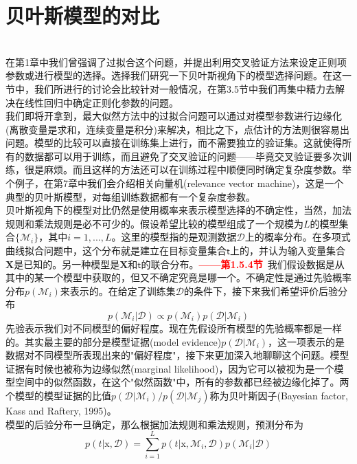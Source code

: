 \documentclass[b5paper]{book}
\numberwithin{equation}{chapter}
\newcommand {\bx} {\boldsymbol{\mathrm{x}}}
\newcommand {\sft} {\boldsymbol{\mathsf{t}}}
\newcommand {\calD} {\mathcal{D}}
\newcommand {\insertline} {\noindent{\color{red} \rule[5pt]{\textwidth}{0.1em}}}
\begin{document}
	\section{贝叶斯模型的对比}
	\insertline\\
	\textnormal{
	\indent 在第1章中我们曾强调了过拟合这个问题，并提出利用交叉验证方法来设定正则项参数或进行模型的选择。选择我们研究一下贝叶斯视角下的模型选择问题。在这一节中，我们所进行的讨论会比较针对一般情况，在第3.5节中我们再集中精力去解决在线性回归中确定正则化参数的问题。\\
	\indent 我们即将开拿到，最大似然方法中的过拟合问题可以通过对模型参数进行边缘化(离散变量是求和，连续变量是积分)来解决，相比之下，点估计的方法则很容易出问题。模型的比较可以直接在训练集上进行，而不需要独立的验证集。这就使得所有的数据都可以用于训练，而且避免了交叉验证的问题——毕竟交叉验证要多次训练，很是麻烦。而且这样的方法还可以在训练过程中顺便同时确定复杂度参数。举个例子，在第7章中我们会介绍相关向量机(relevance vector machine)，这是一个典型的贝叶斯模型，对每组训练数据都有一个复杂度参数。\\
	\indent 贝叶斯视角下的模型对比仍然是使用概率来表示模型选择的不确定性，当然，加法规则和乘法规则是必不可少的。假设希望比较的模型组成了一个规模为$L$的模型集合$\{\mathcal{M}_i\}$，其中$i=1,...,L$。这里的模型指的是观测数据$\calD$上的概率分布。在多项式曲线拟合问题中，这个分布就是建立在目标变量集合$\sft$上的，并认为输入变量集合$\mathbf{X}$是已知的。另一种模型是$\mathbf{X}$和$\sft$的联合分布。\textcolor{red}{\textbf{——第1.5.4节}}\ 我们假设数据是从其中的某一个模型中获取的，但又不确定究竟是哪一个。不确定性是通过先验概率分布$p(\mathcal{M}_i)$来表示的。在给定了训练集$\calD$的条件下，接下来我们希望评价后验分布
	\begin{equation}
		p(\mathcal{M}_i|\calD) \propto p(\mathcal{M}_i)p(\calD|\mathcal{M}_i)
	\end{equation}
	先验表示我们对不同模型的偏好程度。现在先假设所有模型的先验概率都是一样的。其实最主要的部分是模型证据(model evidence)$p(\calD|\mathcal{M}_i)$，这一项表示的是数据对不同模型所表现出来的"偏好程度"，接下来更加深入地聊聊这个问题。模型证据有时候也被称为边缘似然(marginal likelihood)，因为它可以被视为是一个模型空间中的似然函数，在这个"似然函数"中，所有的参数都已经被边缘化掉了。两个模型的模型证据的比值$p(\calD|\mathcal{M}_i)/p(\calD|\mathcal{M}_j)$称为贝叶斯因子(Bayesian factor, Kass and Raftery, 1995)。\\
	\indent 模型的后验分布一旦确定，那么根据加法规则和乘法规则，预测分布为
	\begin{equation}
		p(t|\bx,\calD) = \sum_{i=1}^L p(t|\bx,\mathcal{M}_i, \calD)p(\mathcal{M}_i|\calD)

\end{equation}}
\end{document}
